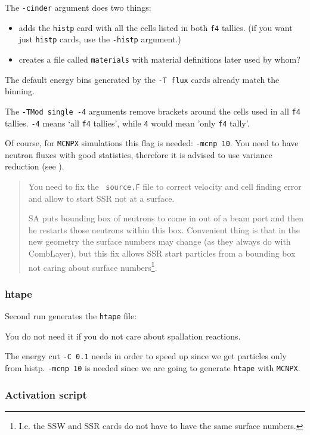 The {\tt -cinder} argument does two things:
\begin{itemize}
\item adds the {\tt histp} card with all the cells listed in both {\tt f4} tallies.
  (if you want just {\tt histp} cards, use the {\tt -histp} argument.)
\item creates a file called {\tt materials} with material definitions later used by \alert{whom}?
\end{itemize}
The default energy bins generated by the {\tt -T flux} cards already match the \cinder binning.

The {\tt -TMod single -4} arguments remove brackets around the cells used in all {\tt f4} tallies.
{\tt -4} means `all {\tt f4} tallies', while
{\tt 4} would mean 'only {\tt f4} tally'.

Of course, for {\tt MCNPX} simulations this flag is needed: {\tt -mcnp 10}.
You need to have neutron fluxes with good statistics, therefore it is advised to use variance reduction (see ).

\begin{quote}
You need to fix the \mcnp\ {\tt source.F} file to correct velocity and cell finding error and allow to start SSR not at a surface.

SA puts bounding box of neutrons to come in out of a beam port and then he restarts those neutrons within this box.
Convenient thing is that in the new geometry the surface numbers may change (as they always do with CombLayer), but
this fix allows SSR start particles from a bounding box not caring about surface numbers\footnote{I.e. the SSW and SSR cards do not have to have the same surface numbers.}.
\end{quote}

\subsubsection{htape}
Second run generates the {\tt htape} file:

You do not need it if you do not care about spallation reactions.

The energy cut {\tt -C 0.1} needs in order to speed up since we get particles only from histp.
{\tt -mcnp 10} is needed since we are going to generate {\tt htape} with {\tt MCNPX}.

\subsubsection{Activation script}

